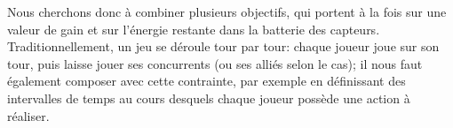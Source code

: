 Nous cherchons donc à combiner plusieurs objectifs, qui portent à la fois sur une valeur de gain et sur l'énergie restante dans la batterie des capteurs.
Traditionnellement, un jeu se déroule tour par tour: chaque joueur joue sur son tour, puis laisse jouer ses concurrents (ou ses alliés selon le cas); il nous faut également composer avec cette contrainte, par exemple en définissant des intervalles de temps au cours desquels chaque joueur possède une action à réaliser.

